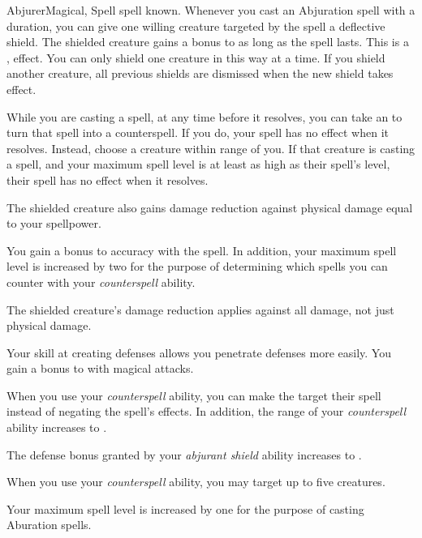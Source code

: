     \begin{feat}{Abjurer}{Magical, Spell}
        \featpre {} spell known.
        \featben
         Whenever you cast an Abjuration spell with a duration, you can give one willing creature targeted by the spell a deflective shield.
        The shielded creature gains a  bonus to  as long as the spell lasts.
        This is a ,  effect.
        You can only shield one creature in this way at a time.
        If you shield another creature, all previous shields are dismissed when the new shield takes effect.

         While you are casting a spell, at any time before it resolves, you can take an  to turn that spell into a counterspell.
        If you do, your spell has no effect when it resolves.
        Instead, choose a creature within \rngmed range of you.
        If that creature is casting a spell, and your maximum spell level is at least as high as their spell's level, their spell has no effect when it resolves.

         The shielded creature also gains damage reduction against physical damage equal to your spellpower.

         You gain a  bonus to accuracy with the  spell.
        In addition, your maximum spell level is increased by two for the purpose of determining which spells you can counter with your \textit{counterspell} ability.

         The shielded creature's damage reduction applies against all damage, not just physical damage.

         Your skill at creating defenses allows you penetrate defenses more easily.
        You gain a  bonus to  with magical attacks.

         When you use your \textit{counterspell} ability, you can make the target  their spell instead of negating the spell's effects.
        In addition, the range of your \textit{counterspell} ability increases to \rnglong.

         The defense bonus granted by your \textit{abjurant shield} ability increases to .

         When you use your \textit{counterspell} ability, you may target up to five creatures.

         Your maximum spell level is increased by one for the purpose of casting Aburation spells.
    \end{feat}

